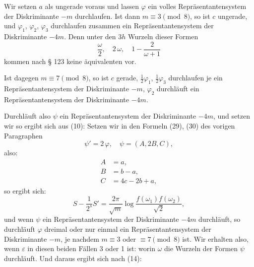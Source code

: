 
Wir setzen $a$ als ungerade voraus und lassen $\varphi$ ein volles
Repräsentantensystem der Diskriminante $-m$ durchlaufen. Ist
dann $m \equiv 3 \pmod 8$, so ist $c$ ungerade, und $\varphi_1$, $\varphi_2$, $\varphi_3$
durchlaufen zusammen ein Repräsentantensystem der Diskriminante $-4m$. Denn unter den $3h$ Wurzeln dieser Formen
\[
\frac{\omega}{2}, \quad 2\,\omega, \quad 1 - \frac{2}{\omega+1}
\]
kommen nach § 123 keine äquivalenten vor.

Ist dagegen $m \equiv 7 \pmod 8$, so ist $c$ gerade, $\frac{1}{2}\varphi_1$, $\frac{1}{2}\varphi_3$ durchlaufen je ein Repräsentantensystem der Diskriminante $-m$, $\varphi_2$
durchläuft ein Repräsentantensystem der Diskriminante $-4m$.

Durchläuft also $\psi$ ein Repräsentantensystem der Diskriminante $-4m$, und setzen wir
so ergibt sich aus (10):
Setzen wir in den Formeln (29), (30) des vorigen Paragraphen
\[
\psi' = 2\,\varphi, \quad \psi = (A, 2B, C),
\]
also:
\[
\begin{aligned}
A &= a, \\
B &= b - a, \\
C &= 4c - 2b + a,
\end{aligned}
\]
so ergibt sich:
\[
S - \frac{1}{2^s} S' = \frac{2\pi}{\sqrt{m}} \log \frac{f(\omega_1)f(\omega_2)}{\sqrt{2}},
\]
und wenn $\psi$ ein Repräsentantensystem der Diskriminante $-4m$
durchläuft, so durchläuft $\varphi$ dreimal oder nur einmal ein Repräsentantensystem der Diskriminante $-m$, je nachdem $m \equiv 3$
oder $\equiv 7 \pmod 8$ ist. Wir erhalten also, wenn $\varepsilon$ in diesen
beiden Fällen 3 oder 1 ist:
worin $\omega$ die Wurzeln der Formen $\psi$ durchläuft. Und daraus
ergibt sich nach (14):
